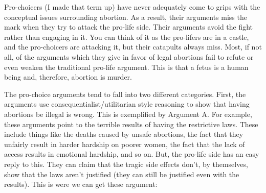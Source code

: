 Pro-choicers (I made that term up) have never adequately come to grips with the conceptual issues surrounding abortion. As a result, their arguments miss the mark when they try to attack the pro-life side. Their arguments avoid the fight rather than engaging in it. You can think of it as the pro-lifers are in a castle, and the pro-choicers are attacking it, but their catapults always miss.  Most, if not all, of the arguments which they give in favor of legal abortions fail to refute or even weaken the traditional pro-life argument. This is that a fetus is a human being and, therefore, abortion is murder.

The pro-choice arguments tend to fall into two different categories. First, the arguments use consequentialist/utilitarian style reasoning to show that having abortions be illegal is wrong. This is exemplified by Argument A. For example, these arguments point to the terrible results of having the restrictive laws. These include things like the deaths caused by unsafe abortions, the fact that they unfairly result in harder hardship on poorer women, the fact that the lack of access results in emotional hardship, and so on. But, the pro-life side has an easy reply to this. They can claim that the tragic side effects don't, by themselves, show that the laws aren't justified (they can still be justified even with the results). This is were we can get these argument: 

